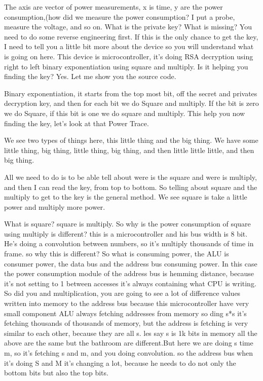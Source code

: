 The axis are vector of power measurements, x is time, y are the power
consumption,(how did we measure the power consumption? I put a probe, measure the
voltage, and so on. What is the private key? What is missing? You need to do some
reverse engineering first. If this is the only chance to get the key, I need to
tell you a little bit more about the device so you will understand what is going
on here. This device is microcontroller, it's doing RSA decryption using right
to left binary exponentiation using square and multiply. Is it helping you
finding the key? Yes. Let me show you the source code.

Binary exponentiation, it starts from the top most bit, off the secret and
privates decryption key, and then for each bit we do Square and multiply. If the
bit is zero we do Square, if this bit is one we do square and multiply. This
help you now finding the key, let's look at that Power Trace.

We see two types of things here, this little thing and the big thing. We have
some little thing, big thing, little thing, big thing, and then little little
little, and then big thing.

All we need to do is to be able tell about were is the square and were is
multiply, and then I can read the key, from top to bottom. So telling about
square and the multiply to get to the key is the general method. We see square
is take a little power and multiply more power.

What is square? square is multiply. So why is the power consumption of square
using multiply is different? this is a microcontroller and his bus width is 8
bit. He's doing a convolution between numbers, so it's multiply thousands of
time in frame. so why this is different? So what is consuming power, the ALU is
consumer power, the data bus and the address bus consuming power. In this case
the power consumption module of the address bus is hemming distance, because
it's not setting to 1 between accesses it's always containing what CPU is
writing. So did you and multiplication, you are going to see a lot of difference
values written into memory to the address bus because this microcontroller have
very small component ALU always fetching addresses from memory so ding s*s it's
fetching thousands of thousands of memory, but the address is fetching is very
similar to each other, because they are all s. les say s is 1k bits in memory
all the above are the same but the bathroom are different.But here we are doing
s time m, so it's fetching s and m, and you doing convolution. so the address
bus when it's doing S and M it's changing a lot, because he needs to do not only
the bottom bits but also the top bits.

